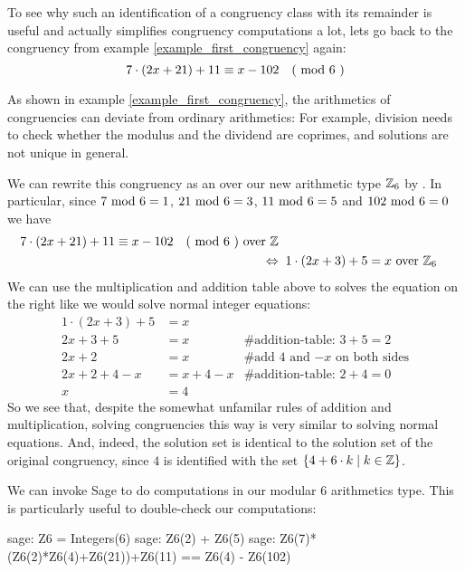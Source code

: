\begin{example} 
To see why such an identification of a congruency class with its remainder is useful and actually simplifies congruency computations a lot, lets go back to the congruency from example \ref{example_first_congruency} again:
\begin{equation}
\label{example_congruency_two_1}
7\cdot(2x+21) + 11 \equiv x-102 \quad \text{( mod } 6 \text{ )}
\end{equation}

As shown in example \ref{example_first_congruency}, the arithmetics of congruencies can deviate from ordinary arithmetics: For example, division needs to check whether the modulus and the dividend are coprimes, and solutions are not unique in general.

We can rewrite this congruency as an  over our new arithmetic type $\mathbb{Z}_6$ by . In particular, since $7 \text{ mod } 6= 1$, $21 \text{ mod } 6= 3$, $11 \text{ mod } 6= 5$ and $102 \text{ mod } 6= 0$ we have
\begin{align*}
7\cdot(2x+21) + 11 \equiv x-102 \quad \text{( mod } 6 \text{ )} \text{ over } \mathbb{Z}\\ 
\Leftrightarrow & \; \; 1\cdot (2x+3) + 5 = x \text{ over } \mathbb{Z}_6
\end{align*}
We can use the multiplication and addition table above to solves the equation on the right like we would solve normal integer equations:  
\begin{align*}
1\cdot (2x+3) + 5 &= x & \text{ }\\
2x+3 + 5 &= x & \text{\# addition-table: } 3+5 = 2 \\
2x+2 &= x & \text{\# add 4 and $-x$ on both sides} \\
2x+2 +4 -x &= x + 4 -x & \text{\# addition-table: } 2+4 = 0 \\
x &= 4 &
\end{align*}
So we see that, despite the somewhat unfamilar rules of addition and multiplication, solving congruencies this way is very similar to solving normal equations. And, indeed, the solution set is identical to the solution set of the original congruency, since $4$ is identified with the set $\{4+6\cdot k\;|\; k\in\mathbb{Z}\}$.

We can invoke Sage to do computations in our modular $6$ arithmetics type. This is particularly useful to double-check our computations:
\begin{sagecommandline}
sage: Z6 = Integers(6)
sage: Z6(2) + Z6(5)
sage: Z6(7)*(Z6(2)*Z6(4)+Z6(21))+Z6(11) == Z6(4) - Z6(102)
\end{sagecommandline}
\end{example}

